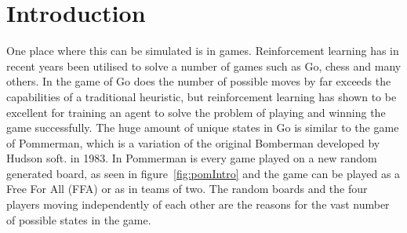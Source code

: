 \section{Introduction}
\label{sec:intro}


\emph{}\cite{pommerman} One place where this can be simulated is in games. Reinforcement learning has in recent years been utilised to solve a number of games such as Go\cite{silver2017masteringgo}\cite{silver2016a}, chess\cite{silver2017masteringchess} and many others\cite{mnih2015a}. In the game of Go does the number of possible moves by far exceeds the capabilities of a traditional heuristic, but reinforcement learning has shown to be excellent for training an agent to solve the problem of playing and winning the game successfully.\cite{silver2017masteringgo} The huge amount of unique states in Go is similar to the game of Pommerman, which is a variation of the original Bomberman developed by Hudson soft. in 1983. In Pommerman is every game played on a new random generated board, as seen in figure~\ref{fig:pomIntro} and the game can be played as a Free For All (FFA) or as in teams of two.\cite{pommerman} The random boards and the four players moving independently of each other are the reasons for the vast number of possible states in the game.

